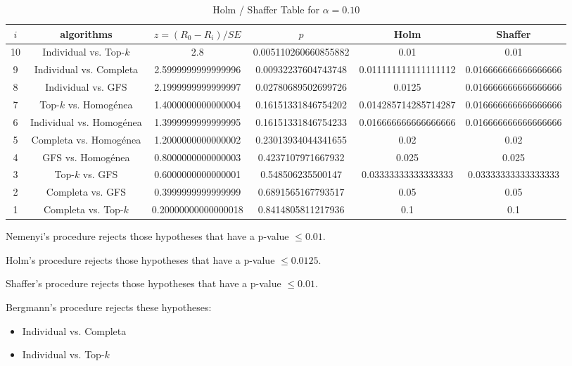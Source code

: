 \documentclass[a4paper,10pt]{article}
\begin{document}
\begin{landscape}
\begin{table}[!htp]
\centering\tiny
\caption{Holm / Shaffer Table for $\alpha=0.10$}
\begin{tabular}{cccccc}
$i$&algorithms&$z=(R_0 - R_i)/SE$&$p$&Holm&Shaffer\\
\hline
10&Individual vs. Top-$k$&2.8&0.005110260660855882&0.01&0.01\\
9&Individual vs. Completa&2.5999999999999996&0.00932237604743748&0.011111111111111112&0.016666666666666666\\
8&Individual vs. GFS&2.1999999999999997&0.02780689502699726&0.0125&0.016666666666666666\\
7&Top-$k$ vs. Homogénea&1.4000000000000004&0.16151331846754202&0.014285714285714287&0.016666666666666666\\
6&Individual vs. Homogénea&1.3999999999999995&0.16151331846754233&0.016666666666666666&0.016666666666666666\\
5&Completa vs. Homogénea&1.2000000000000002&0.23013934044341655&0.02&0.02\\
4&GFS vs. Homogénea&0.8000000000000003&0.4237107971667932&0.025&0.025\\
3&Top-$k$ vs. GFS&0.6000000000000001&0.548506235500147&0.03333333333333333&0.03333333333333333\\
2&Completa vs. GFS&0.3999999999999999&0.6891565167793517&0.05&0.05\\
1&Completa vs. Top-$k$&0.20000000000000018&0.8414805811217936&0.1&0.1\\
\hline
\end{tabular}
\end{table}
Nemenyi's procedure rejects those hypotheses that have a p-value $\le0.01$.


Holm's procedure rejects those hypotheses that have a p-value $\le0.0125$.


Shaffer's procedure rejects those hypotheses that have a p-value $\le0.01$.


Bergmann's procedure rejects these hypotheses:


\begin{itemize}


\item Individual vs. Completa
\item Individual vs. Top-$k$
\end{itemize}



\end{landscape}
\end{document}
